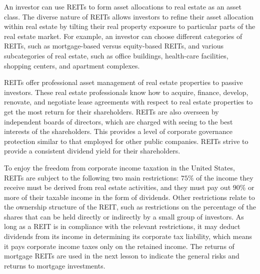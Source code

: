 \documentclass[11pt]{article}
\begin{document}
An investor can use REITs to form asset allocations to real estate as an asset class. The diverse nature of REITs allows investors to refine their asset allocation within real estate by tilting their real property exposure to particular parts of the real estate market. For example, an investor can choose different categories of REITs, such as mortgage-based versus equity-based REITs, and various subcategories of real estate, such as office buildings, health-care facilities, shopping centers, and apartment complexes.

REITs offer professional asset management of real estate properties to passive investors. These real estate professionals know how to acquire, finance, develop, renovate, and negotiate lease agreements with respect to real estate properties to get the most return for their shareholders. REITs are also overseen by independent boards of directors, which are charged with seeing to the best interests of the shareholders. This provides a level of corporate governance protection similar to that employed for other public companies. REITs strive to provide a consistent dividend yield for their shareholders.

To enjoy the freedom from corporate income taxation in the United States, REITs are subject to the following two main restrictions: $75 \%$ of the income they receive must be derived from real estate activities, and they must pay out $90 \%$ or more of their taxable income in the form of dividends. Other restrictions relate to the ownership structure of the REIT, such as restrictions on the percentage of the shares that can be held directly or indirectly by a small group of investors. As long as a REIT is in compliance with the relevant restrictions, it may deduct dividends from its income in determining its corporate tax liability, which means it pays corporate income taxes only on the retained income. The returns of mortgage REITs are used in the next lesson to indicate the general risks and returns to mortgage investments.
\end{document}
